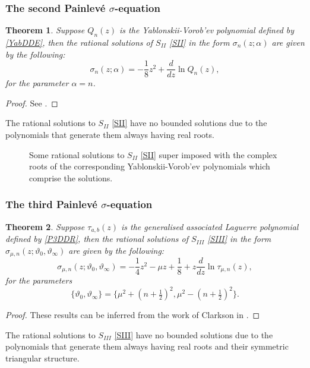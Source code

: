 \documentclass[12pt]{article}
\def\P{Painlev\'e }
\newtheorem{mydef}{Theorem}[section]
\numberwithin{figure}{section}
\numberwithin{equation}{section}
\numberwithin{table}{section}
\begin{document}
\subsubsection{The second \P $\sigma$-equation}
\begin{mydef}
Suppose $Q_n(z)$ is the Yablonskii-Vorob'ev polynomial defined by \eqref{YabDDE}, then the rational solutions of $S_{II}$ \eqref{SII} in the form $\sigma_n(z;\alpha)$ are given by the following:
\begin{equation}
\sigma_n(z;\alpha)=-\frac{1}{8}z^2+\frac{d}{dz}\ln Q_n(z),
\end{equation}
for the parameter $\alpha=n$.
\end{mydef}
\begin{proof}
See \cite{deGruyerCo}.
\end{proof}
The rational solutions to $S_{II}$ \eqref{SII} have no bounded solutions due to the polynomials that generate them always having real roots.
\begin{figure}[H]
\centering
{}
\caption{Some rational solutions to $S_{II}$ \eqref{SII} super imposed with the complex roots of the corresponding Yablonskii-Vorob'ev polynomials which comprise the solutions.}
\end{figure}
\subsubsection{The third \P $\sigma$-equation}
\begin{mydef}
Suppose $\tau_{a,b}(z)$ is the generalised associated Laguerre polynomial defined by \eqref{P3DDR}, then the rational solutions of $S_{III}$ \eqref{SIII} in the form $\sigma_{\mu,n}(z;\vartheta_0,\vartheta_\infty)$ are given by the following:
\begin{equation}
\sigma_{\mu,n}(z;\vartheta_0,\vartheta_\infty)=-\frac{1}{4}z^2-\mu z+\frac{1}{8}+z\frac{d}{dz}\ln\tau_{\mu,n}(z),
\end{equation}
for the parameters $$\{\vartheta_0,\vartheta_\infty\}=\{\mu^2+(n+\tfrac{1}{2})^2,\mu^2-(n+\tfrac{1}{2})^2\}.$$
\end{mydef}
\begin{proof}
These results can be inferred from the work of Clarkson in \cite{P:36:9532}.
\end{proof}
The rational solutions to $S_{III}$ \eqref{SIII} have no bounded solutions due to the polynomials that generate them always having real roots and their symmetric triangular structure.
\end{document}
